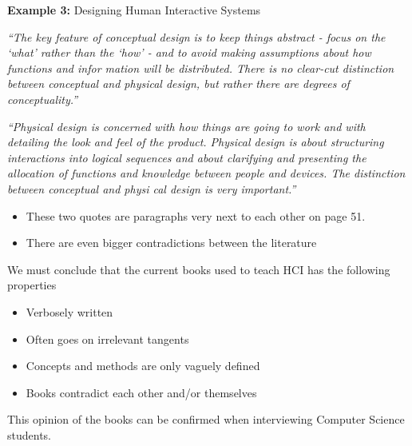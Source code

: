 \begin{frame}
  \textbf{Example 3:} Designing Human Interactive Systems
  
  \medskip
  
  {\tiny \it ``The key feature of conceptual design is to keep things abstract - focus on the ‘what’
rather than the ‘how’ - and to avoid making assumptions about how functions and infor­
mation will be distributed. There is no clear-cut distinction between conceptual and
physical design, but rather there are degrees of conceptuality.''}
  
  \medskip

  {\tiny \it ``Physical design is concerned with how things are going to work and with detailing
the look and feel of the product. Physical design is about structuring interactions into
logical sequences and about clarifying and presenting the allocation of functions and
knowledge between people and devices. The distinction between conceptual and physi­
cal design is very important.''}

  \begin{itemize}
  \item These two quotes are paragraphs very next to each other on page 51.
  \item There are even bigger contradictions between the literature
  \end{itemize}
\end{frame}


\begin{frame}
  We must conclude that the current books used to teach HCI has the following
  properties
  
  \begin{itemize}
  \item Verbosely written
  \item Often goes on irrelevant tangents
  \item Concepts and methods are only vaguely defined
  \item Books contradict each other and/or themselves
  \end{itemize}

  This opinion of the books can be confirmed when interviewing Computer Science students.
\end{frame}


